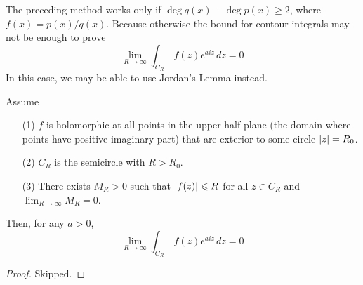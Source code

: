 \vspace*{1em}

\begin{remark}
The preceding method works only if $\deg q(x) - \deg p(x) \geq 2$, where $f(x) = p(x)/q(x)$. Because otherwise the bound for contour integrals may not be enough to prove
\[\lim_{R \to \infty}\int_{C_R}\,f(z)e^{aiz}\,dz = 0\]
In this case, we may be able to use Jordan's Lemma instead.
\end{remark}

\vspace*{1em}

\begin{lemma}
Assume
\begin{itemize}
\item[(1)] $f$ is holomorphic at all points in the upper half plane (the domain where points have positive imaginary part) that are exterior to some circle $\left\lvert z\right\rvert = R_0$.
\item[(2)] $C_R$ is the semicircle with $R > R_0$.
\item[(3)] There exists $M_R > 0$ such that $\left\lvert f(z)\right\rvert \leqslant R$ for all $z \in C_R$ and $\lim_{R \to \infty}M_R = 0$.
\end{itemize}
Then, for any $a > 0$, 
\[\lim_{R \to \infty}\int_{C_R}\,f(z)e^{aiz}\,dz = 0\]
\end{lemma}
\begin{proof}
Skipped.
\end{proof}

\vspace*{1em}

